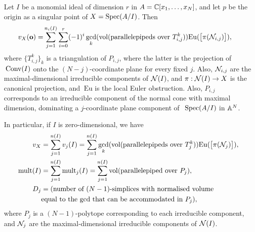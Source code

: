 \documentclass[11pt,a4paper,leqno,noamsfonts]{amsart}
\numberwithin{equation}{section}
\begin{document}
  \begin{theorem}
  \label{combinatorialinterpretation}
Let $I$ be a monomial ideal of dimension $r$ in $A={\mathbb{C}}[x_1,\ldots,x_N]$, and let $p$ be the origin as a singular point of $X=\operatorname{Spec}(A/I)$. Then 
\begin{align*}
v_{X}(\mathbf{o})=&\sum_{j=1}^{n_i(I)}\sum_{i=0}^{r}(-1)^i\gcd_k({\mathrm{vol}}(\text{parallelepipeds over  ${T^k_{i,j}}))$}\mathrm{Eu}(\big[\pi({\mathcal N}_{i,j})\big]),
\end{align*}
 where $\{T^k_{i,j}\}_k$ is a triangulation of $P_{i,j}$, where the latter is the projection of $\text{\:}\mathrm{Conv}(I)$ onto the $(N-j)$-coordinate plane for every fixed $j$. Also, ${\mathcal N}_{i,j}$ are the maximal-dimensional irreducible components of ${\mathcal N}(I)$, and $\pi:{\mathcal N}(I)\to X$ is the canonical projection, and $\:{}\mathrm{Eu}$ is the local Euler obstruction. Also, $P_{i,j}$ corresponds to an irreducible component of the normal cone with maximal dimension, dominating a $j$-coordinate plane component of $\text{\:}\operatorname{Spec}(A/I)$ in ${\mathbb{A}}^N$. 

In particular, if $I$ is zero-dimensional, we have
\begin{align*}
v_X&=\sum_{j=1}^{n(I)}v_j(I)=\sum_{j=1}^{n(I)}\gcd_k({\mathrm{vol}}(\text{parallelepipeds over $T^k_j$}))\mathrm{Eu}(\big[\pi({\mathcal N}_{j})\big]),\\
\mathrm{mult}(I)&=\sum_{j=1}^{n(I)}\mathrm{mult}_j(I)=\sum_{j=1}^{n(I)}{\mathrm{vol}}(\text{parallelepiped over $P_j$}),\\
D_j&= (\text{number of $(N-1)$-simplices with normalised volume} \\&\text{equal to the $\gcd$ that can be accommodated in $P_j$}),
\end{align*}
where $P_j$ is a $(N-1)$-polytope corresponding to each irreducible component, and ${\mathcal N}_j$ are the maximal-dimensional irreducible components of ${\mathcal N}(I)$. 

\end{theorem}
\end{document}
